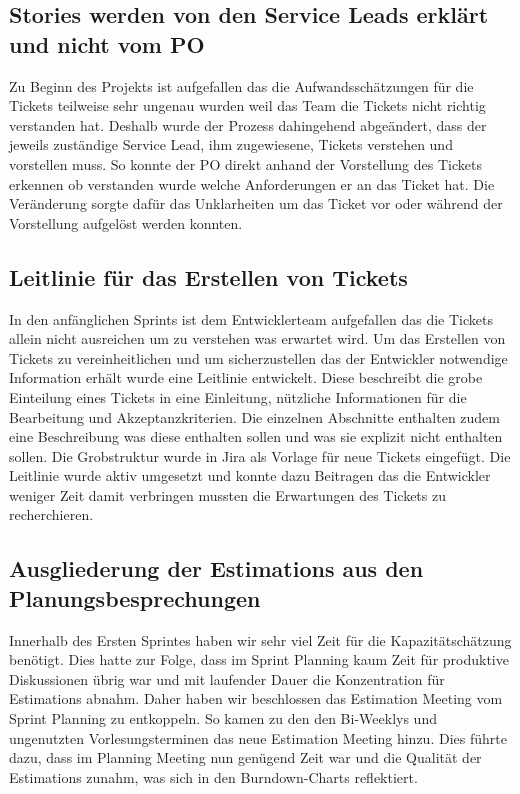 \subsection{Stories werden von den Service Leads erklärt und nicht vom PO}
Zu Beginn des Projekts ist aufgefallen das die Aufwandsschätzungen für die Tickets 
teilweise sehr ungenau wurden weil das Team die Tickets nicht richtig verstanden hat. 
Deshalb wurde der Prozess dahingehend abgeändert, dass der jeweils zuständige Service 
Lead, ihm zugewiesene, Tickets verstehen und vorstellen muss. So konnte der PO direkt 
anhand der Vorstellung des Tickets erkennen ob verstanden wurde welche Anforderungen 
er an das Ticket hat. Die Veränderung sorgte dafür das Unklarheiten um das Ticket vor
oder während der Vorstellung aufgelöst werden konnten. 

\subsection{Leitlinie für das Erstellen von Tickets}
In den anfänglichen Sprints ist dem Entwicklerteam aufgefallen das die Tickets allein nicht ausreichen 
um zu verstehen was erwartet wird. Um das Erstellen von Tickets zu vereinheitlichen und um sicherzustellen 
das der Entwickler notwendige Information erhält wurde eine Leitlinie entwickelt. 
Diese beschreibt die grobe Einteilung eines Tickets in eine Einleitung, nützliche Informationen für die 
Bearbeitung und Akzeptanzkriterien. Die einzelnen Abschnitte enthalten zudem eine Beschreibung was diese 
enthalten sollen und was sie explizit nicht enthalten sollen. Die Grobstruktur wurde in Jira als Vorlage 
für neue Tickets eingefügt.
Die Leitlinie wurde aktiv umgesetzt und konnte dazu Beitragen das die Entwickler weniger Zeit damit 
verbringen mussten die Erwartungen des Tickets zu recherchieren. 

\subsection{Ausgliederung der Estimations aus den Planungsbesprechungen}

Innerhalb des Ersten Sprintes haben wir sehr viel Zeit für die Kapazitätschätzung benötigt. 
Dies hatte zur Folge, dass im Sprint Planning kaum Zeit für produktive Diskussionen übrig war und mit laufender Dauer die Konzentration für Estimations abnahm.
Daher haben wir beschlossen das Estimation Meeting vom Sprint Planning zu entkoppeln.
So kamen zu den den Bi-Weeklys und ungenutzten Vorlesungsterminen das neue Estimation Meeting hinzu.
Dies führte dazu, dass im Planning Meeting nun genügend Zeit war und die Qualität der Estimations zunahm, was sich in den Burndown-Charts reflektiert.

